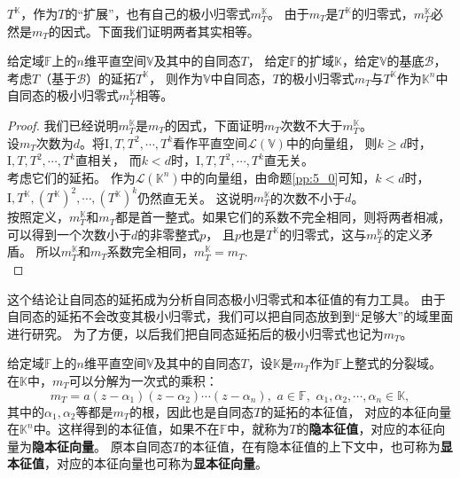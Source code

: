 \documentclass[12pt,UTF8]{ctexbook}
\begin{document}
$T^{\mathbb{K}}$，作为$T$的“扩展”，也有自己的极小归零式$m_T^{\mathbb{K}}$。
由于$m_T$是$T^{\mathbb{K}}$的归零式，$m_T^{\mathbb{K}}$必然是$m_T$的因式。下面我们证明两者其实相等。

\begin{pp}\label{pp:9_6}
    给定域$\mathbb{F}$上的$n$维平直空间$\mathbb{V}$及其中的自同态$T$，
    给定$\mathbb{F}$的扩域$\mathbb{K}$，给定$\mathbb{V}$的基底$\mathcal{B}$，
    考虑$T$（基于$\mathcal{B}$）的延拓$T^{\mathbb{K}}$，
    则作为$\mathbb{V}$中自同态，$T$的极小归零式$m_T$与$T^{\mathbb{K}}$作为$\mathbb{K}^n$中自同态的极小归零式$m_T^{\mathbb{K}}$相等。
\end{pp}
\begin{proof} %
    我们已经说明$m_T^{\mathbb{K}}$是$m_T$的因式，下面证明$m_T$次数不大于$m_T^{\mathbb{K}}$。\\
    设$m_T$次数为$d$。将$\mathrm{I}, T, T^2, \cdots, T^k$看作平直空间$\mathcal{L}(\mathbb{V})$中的向量组，
    则$k \geqslant d$时，$\mathrm{I}, T, T^2, \cdots, T^k$直相关，
    而$k < d$时，$\mathrm{I}, T, T^2, \cdots, T^{k}$直无关。\\
    考虑它们的延拓。
    作为$\mathcal{L}(\mathbb{K}^n)$中的向量组，由命题\ref{pp:5_0}可知，$k < d$时，
    $\mathrm{I}, T^{\mathbb{K}}, \left(T^{\mathbb{K}}\right)^2, \cdots, \left(T^{\mathbb{K}}\right)^{k}$仍然直无关。
    这说明$m_T^{\mathbb{K}}$的次数不小于$d$。\\
    按照定义，$m_T^{\mathbb{K}}$和$m_T$都是首一整式。如果它们的系数不完全相同，则将两者相减，可以得到一个次数小于$d$的非零整式$p$，
    且$p$也是$T^{\mathbb{K}}$的归零式，这与$m_T^{\mathbb{K}}$的定义矛盾。
    所以$m_T^{\mathbb{K}}$和$m_T$系数完全相同，$m_T^{\mathbb{K}} = m_T$.\\
\end{proof}


这个结论让自同态的延拓成为分析自同态极小归零式和本征值的有力工具。
由于自同态的延拓不会改变其极小归零式，我们可以把自同态放到到“足够大”的域里面进行研究。
为了方便，以后我们把自同态延拓后的极小归零式也记为$m_T$。

给定域$\mathbb{F}$上的$n$维平直空间$\mathbb{V}$及其中的自同态$T$，设$\mathbb{K}$是$m_T$作为$\mathbb{F}$上整式的分裂域。
在$\mathbb{K}$中，$m_T$可以分解为一次式的乘积：
$$ m_T = a(z - \alpha_1)(z - \alpha_2)\cdots(z - \alpha_n), \,\, a \in \mathbb{F}, \,\, \alpha_1, \alpha_2, \cdots ,  \alpha_n \in \mathbb{K}, $$
其中的$\alpha_1, \alpha_2$等都是$m_T$的根，因此也是自同态$T$的延拓的本征值，
对应的本征向量在$\mathbb{K}^n$中。这样得到的本征值，如果不在$\mathbb{F}$中，就称为$T$的\textbf{隐本征值}，对应的本征向量为\textbf{隐本征向量}。
原本自同态$T$的本征值，在有隐本征值的上下文中，也可称为\textbf{显本征值}，对应的本征向量也可称为\textbf{显本征向量}。
\end{document}
